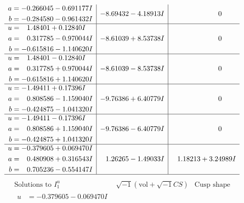 \documentclass[1p]{elsarticle_modified}
\theoremstyle{definition}
\newcommand{\I}{\sqrt{-1}}
\begin{document}
$$\begin{array}{c|c|c}
\begin{aligned}
a &= -0.266045 - 0.691177 I \\
b &= -0.284580 - 0.961432 I\end{aligned}
 & -8.69432 - 4.18913 I & \phantom{-0.000000 } 0 \\ \hline\begin{aligned}
u &= \phantom{-}1.48401 + 0.12840 I \\
a &= \phantom{-}0.317785 - 0.970044 I \\
b &= -0.615816 - 1.140620 I\end{aligned}
 & -8.61039 + 8.53738 I & \phantom{-0.000000 } 0 \\ \hline\begin{aligned}
u &= \phantom{-}1.48401 - 0.12840 I \\
a &= \phantom{-}0.317785 + 0.970044 I \\
b &= -0.615816 + 1.140620 I\end{aligned}
 & -8.61039 - 8.53738 I & \phantom{-0.000000 } 0 \\ \hline\begin{aligned}
u &= -1.49411 + 0.17396 I \\
a &= \phantom{-}0.808586 - 1.159040 I \\
b &= -0.424875 - 1.041320 I\end{aligned}
 & -9.76386 + 6.40779 I & \phantom{-0.000000 } 0 \\ \hline\begin{aligned}
u &= -1.49411 - 0.17396 I \\
a &= \phantom{-}0.808586 + 1.159040 I \\
b &= -0.424875 + 1.041320 I\end{aligned}
 & -9.76386 - 6.40779 I & \phantom{-0.000000 } 0 \\ \hline\begin{aligned}
u &= -0.379605 + 0.069470 I \\
a &= \phantom{-}0.480908 + 0.316543 I \\
b &= \phantom{-}0.705236 - 0.554147 I\end{aligned}
 & \phantom{-}1.26265 - 1.49033 I & \phantom{-}1.18213 + 3.24989 I\\
 \hline 
 \end{array}$$\newpage$$\begin{array}{c|c|c}  
\text{Solutions to }I^u_{1}& \I (\text{vol} + \sqrt{-1}CS) & \text{Cusp shape}\\
 \hline 
\begin{aligned}
u &= -0.379605 - 0.069470 I \\

\end{aligned}
\end{array}$$
\end{document}
